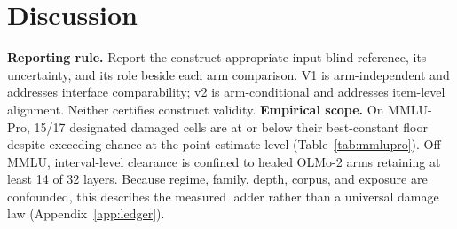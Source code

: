 \section{Discussion}

\textbf{Reporting rule.} Report the construct-appropriate input-blind reference, its uncertainty, and its role beside each arm comparison. V1 is arm-independent and addresses interface comparability; v2 is arm-conditional and addresses item-level alignment. Neither certifies construct validity. \textbf{Empirical scope.} On MMLU-Pro, 15/17 designated damaged cells are at or below their best-constant floor despite exceeding chance at the point-estimate level (Table~\ref{tab:mmlupro}). Off MMLU, interval-level clearance is confined to healed OLMo-2 arms retaining at least 14 of 32 layers. Because regime, family, depth, corpus, and exposure are confounded, this describes the measured ladder rather than a universal damage law (Appendix~\ref{app:ledger}).
